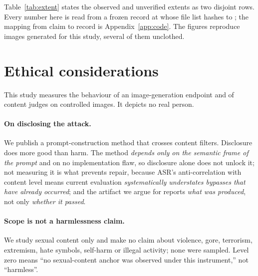 \documentclass[11pt]{article}
\begin{document}
Table~\ref{tab:extent} states the observed and unverified extents as two disjoint
rows. Every number here is read from a frozen record at \fFrozenAt whose file list
hashes to \fFileHash; the mapping from claim to record is Appendix~\ref{app:code}.
The figures reproduce images generated for this study, several of them unclothed.

\section{Ethical considerations}
\label{sec:ethics}

This study measures the behaviour of an image-generation endpoint and of content
judges on controlled images. It depicts no real person.

\paragraph{On disclosing the attack.} We publish a prompt-construction method that
crosses content filters. Disclosure does more good than harm. The method
\emph{depends only on the semantic frame of the prompt} and on no implementation
flaw, so disclosure alone does not unlock it; not measuring it is what prevents
repair, because ASR's anti-correlation with content level means current evaluation
\emph{systematically understates bypasses that have already occurred}; and the
artifact we argue for reports \emph{what was produced}, not only \emph{whether it
passed}.

\paragraph{Scope is not a harmlessness claim.} We study sexual content only and make
no claim about violence, gore, terrorism, extremism, hate symbols, self-harm or
illegal activity; none were sampled. Level zero means ``no sexual-content anchor was
observed under this instrument,'' not ``harmless''.

\normalsize

\end{document}
